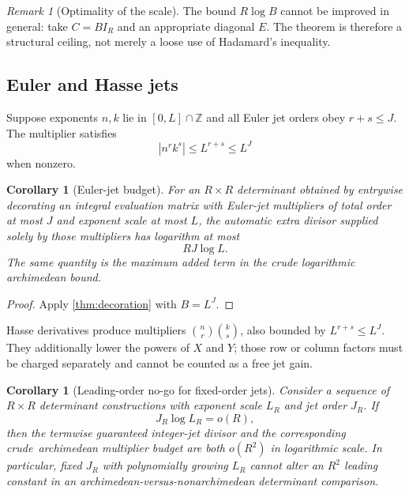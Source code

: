 \documentclass[11pt,oneside]{article}
\newtheorem{corollary}[theorem]{Corollary}
\theoremstyle{definition}
\theoremstyle{remark}
\newtheorem{remark}[theorem]{Remark}
\newcommand{\Z}{\mathbb Z}
\newcommand{\abs}[1]{\left|#1\right|}
\begin{document}
\begin{remark}[Optimality of the scale]
The bound $R\log B$ cannot be improved in general: take $C=B I_R$ and an
appropriate diagonal $E$.  The theorem is therefore a structural ceiling,
not merely a loose use of Hadamard's inequality.
\end{remark}

\subsection{Euler and Hasse jets}

Suppose exponents $n,k$ lie in $[0,L]\cap\Z$ and all Euler jet orders obey
$r+s\le J$.  The multiplier satisfies
\[
 \abs{n^rk^s}\le L^{r+s}\le L^J
\]
when nonzero.

\begin{corollary}[Euler-jet budget]
\label{cor:eulerbudget}
For an $R\times R$ determinant obtained by entrywise decorating an integral
evaluation matrix with Euler-jet multipliers of total order at most $J$ and
exponent scale at most $L$, the automatic extra divisor supplied solely by
those multipliers has logarithm at most
\begin{equation}
  RJ\log L.
  \label{eq:eulerbudget}
\end{equation}
The same quantity is the maximum added term in the crude logarithmic
archimedean bound.
\end{corollary}

\begin{proof}
Apply \cref{thm:decoration} with $B=L^J$.
\end{proof}

Hasse derivatives produce multipliers $\binom nr\binom ks$, also bounded by
$L^{r+s}\le L^J$.  They additionally lower the powers of $X$ and $Y$; those
row or column factors must be charged separately and cannot be counted as a
free jet gain.

\begin{corollary}[Leading-order no-go for fixed-order jets]
\label{cor:jetnogo}
Consider a sequence of $R\times R$ determinant constructions with exponent
scale $L_R$ and jet order $J_R$.  If
\begin{equation}
  J_R\log L_R=o(R),
  \label{eq:subcriticaljets}
\end{equation}
then the termwise guaranteed integer-jet divisor and the corresponding crude\
archimedean multiplier budget are both $o(R^2)$ in logarithmic scale.  In particular, fixed $J_R$ with polynomially growing $L_R$ cannot
alter an $R^2$ leading constant in an archimedean-versus-nonarchimedean
determinant comparison.
\end{corollary}
\end{document}

